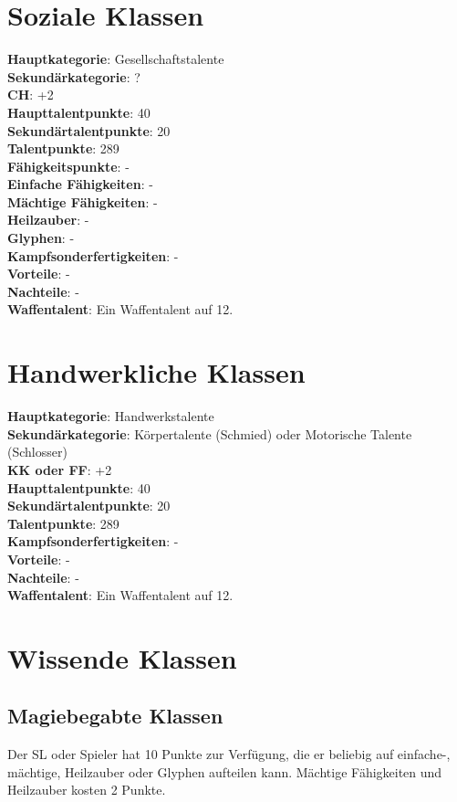 \section{Soziale Klassen}
\textbf{Hauptkategorie}: Gesellschaftstalente \\
\textbf{Sekundärkategorie}: ? \\
\textbf{CH}: +2 \\
\textbf{Haupttalentpunkte}: 40 \\
\textbf{Sekundärtalentpunkte}: 20 \\
\textbf{Talentpunkte}: 289 \\
\textbf{Fähigkeitspunkte}: - \\
\textbf{Einfache Fähigkeiten}: - \\
\textbf{Mächtige Fähigkeiten}: - \\
\textbf{Heilzauber}: - \\
\textbf{Glyphen}: - \\
\textbf{Kampfsonderfertigkeiten}: - \\
\textbf{Vorteile}: - \\
\textbf{Nachteile}: - \\
\textbf{Waffentalent}: Ein Waffentalent auf 12.

\section{Handwerkliche Klassen}
\textbf{Hauptkategorie}: Handwerkstalente \\
\textbf{Sekundärkategorie}: Körpertalente (Schmied) oder Motorische Talente (Schlosser) \\
\textbf{KK oder FF}: +2 \\
\textbf{Haupttalentpunkte}: 40 \\
\textbf{Sekundärtalentpunkte}: 20 \\
\textbf{Talentpunkte}: 289 \\
\textbf{Kampfsonderfertigkeiten}: - \\
\textbf{Vorteile}: - \\
\textbf{Nachteile}: - \\
\textbf{Waffentalent}: Ein Waffentalent auf 12.

\section{Wissende Klassen}
\subsection{Magiebegabte Klassen}
Der SL oder Spieler hat 10 Punkte zur Verfügung, die er beliebig auf einfache-, mächtige, Heilzauber oder Glyphen aufteilen kann. Mächtige Fähigkeiten und Heilzauber kosten 2 Punkte.

